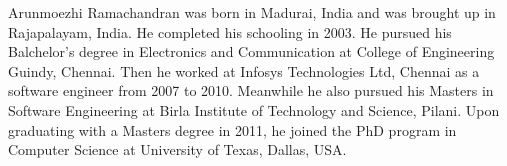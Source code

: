 Arunmoezhi Ramachandran was born in Madurai, India and was brought up in Rajapalayam, India. He completed his schooling in 2003. He pursued his Balchelor's degree in Electronics and Communication at College of Engineering Guindy, Chennai. Then he worked at Infosys Technologies Ltd, Chennai as a software engineer from 2007 to 2010. Meanwhile he also pursued his Masters in Software Engineering at Birla Institute of Technology and Science, Pilani. Upon graduating with a Masters degree in 2011, he joined the PhD program in Computer Science at University of Texas, Dallas, USA.